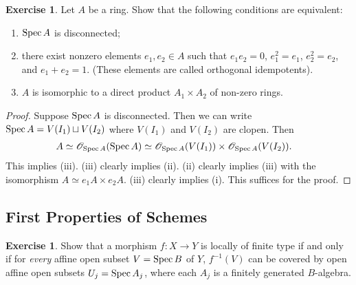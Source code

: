 \documentclass[]{pcmi}
\theoremstyle{plain}
\theoremstyle{definition}
\newtheorem{Exercise}[subsubsection]{Exercise}
\theoremstyle{remark}
\begin{document}
\begin{Exercise}
    Let $A$ be a ring. Show that the following conditions are equivalent:
    \begin{enumerate}[label = (\roman*)]
        \item $\operatorname{Spec} A$ is disconnected; 
        \item there exist nonzero elements $e_1, e_2 \in A$ such that $e_1e_2 = 0$, $e_1^2 = e_1$, $e_2^2 = e_2$, and $e_1 + e_2 = 1$. (These elements are called orthogonal idempotents). 
        \item $A$ is isomorphic to a direct product $A_1 \times A_2$ of non-zero rings. 
    \end{enumerate}
\end{Exercise}

\begin{proof}
    Suppose $\operatorname{Spec} A$ is disconnected. Then we can write $\operatorname{Spec} A = V(I_1) \sqcup V(I_2)$ where $V(I_1)$ and $V(I_2)$ are clopen. Then 
    \begin{align*}
        A \simeq \mathscr{O}_{\operatorname{Spec} A}(\operatorname{Spec} A) & \simeq \mathscr{O}_{\operatorname{Spec} A} (V(I_1)) \times \mathscr{O}_{\operatorname{Spec} A}(V(I_2)).
    \end{align*}
    This implies (iii). (iii) clearly implies (ii). (ii) clearly implies (iii) with the isomorphism $A \simeq e_1A \times e_2A$. (iii) clearly implies (i). This suffices for the proof. 
\end{proof}


\subsection{First Properties of Schemes}

\begin{Exercise}\label{Exercise:2.3.1}
    Show that a morphism $f : X \to Y$ is locally of finite type if and only if for \emph{every} affine open subset $V = \operatorname{Spec} B$ of $Y$, $f^{-1}(V)$ can be covered by open affine open subsets $U_j = \operatorname{Spec} A_j$, where each $A_j$ is a finitely generated $B$-algebra. 
\end{Exercise}
\end{document}
